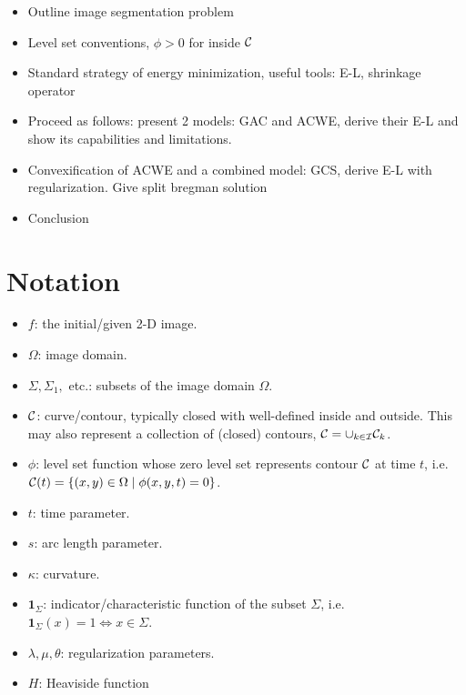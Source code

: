 \begin{itemize}
	\item Outline image segmentation problem 
	
	\item Level set conventions, $\phi>0$ for inside $\mathcal{C}$
	
	\item Standard strategy of energy minimization, useful tools: E-L, shrinkage operator
	
	\item Proceed as follows: present 2 models: GAC and ACWE, derive their E-L and show its capabilities and limitations.
	
	\item Convexification of ACWE and a combined model: GCS, derive E-L with regularization. Give split bregman solution
	
	\item Conclusion
\end{itemize}

\section{Notation}
\begin{itemize}
	\item $f$: the initial/given 2-D image.
	
	\item $\Omega$: image domain.
	
	\item $\Sigma, \Sigma_1,$ etc.: subsets of the image domain $\Omega$.
	
	\item $\mathcal{C}$: curve/contour, typically closed with well-defined inside and outside. This may also represent a collection of (closed) contours, $\mathcal{C} = \cup_{k \in \mathcal{I}} \mathcal{C}_k$.
	
	\item $\phi$: level set function whose zero level set represents contour $\mathcal{C}$ at time $t$, i.e. $\mathcal{C}(t) = \{(x,y) \in \Omega \mid \phi(x,y,t) = 0\}$. 
	
	\item $t$: time parameter. 
	
	\item $s$: arc length parameter.
	
	\item $\kappa$: curvature. 
	
	\item $\mathbf{1}_\Sigma$: indicator/characteristic function of the subset $\Sigma$, i.e. $\mathbf{1}_\Sigma(x) = 1 \iff x \in \Sigma$.
	
	\item $\lambda, \mu, \theta$: regularization parameters.
	
	\item $H$: Heaviside function
	
\end{itemize}